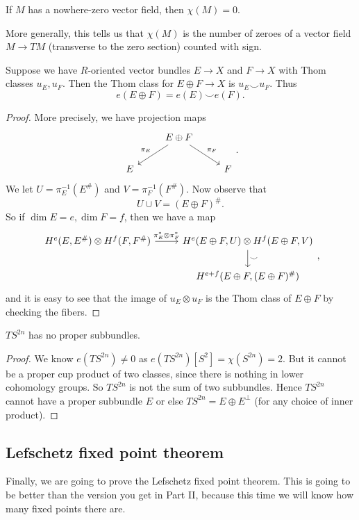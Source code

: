 \documentclass[a4paper]{article}
\theoremstyle{definition}
\begin{document}
\begin{cor}
  If $M$ has a nowhere-zero vector field, then $\chi(M) = 0$.
\end{cor}

More generally, this tells us that $\chi(M)$ is the number of zeroes of a vector field $M \to TM$ (transverse to the zero section) counted with sign.

\begin{lemma}
  Suppose we have $R$-oriented vector bundles $E \to X$ and $F \to X$ with Thom classes $u_E, u_F$. Then the Thom class for $E \oplus F \to X$ is $u_E \smile u_F$. Thus
  \[
    e(E \oplus F) = e(E) \smile e(F).
  \]
\end{lemma}

\begin{proof}
  More precisely, we have projection maps
  \[
    \begin{tikzcd}
      & E \oplus F \ar[dl, "\pi_E"'] \ar[rd, "\pi_F"]\\
      E & & F
    \end{tikzcd}.
  \]
  We let $U = \pi_E^{-1}(E^\#)$ and $V = \pi_F^{-1}(F^\#)$. Now observe that
  \[
    U \cup V = (E \oplus F)^\#.
  \]
  So if $\dim E = e, \dim F = f$, then we have a map
  \[
    \begin{tikzcd}
      H^e(E, E^\#) \otimes H^f(F, F^\#) \ar[r, "\pi_E^* \otimes \pi_F^*"] & H^e(E \oplus F, U) \otimes H^f(E \oplus F, V) \ar[d, "\smile"] \\
      & H^{e + f}(E \oplus F, (E \oplus F)^\#)
    \end{tikzcd},
  \]
  and it is easy to see that the image of $u_E \otimes u_F$ is the Thom class of $E \oplus F$ by checking the fibers.
\end{proof}

\begin{cor}
  $TS^{2n}$ has no proper subbundles.
\end{cor}

\begin{proof}
  We know $e(TS^{2n}) \not= 0$ as $e(TS^{2n})[S^2] = \chi(S^{2n}) = 2$. But it cannot be a proper cup product of two classes, since there is nothing in lower cohomology groups. So $TS^{2n}$ is not the sum of two subbundles. Hence $TS^{2n}$ cannot have a proper subbundle $E$ or else $TS^{2n} = E \oplus E^\perp$ (for any choice of inner product).
\end{proof}

\subsection{Lefschetz fixed point theorem}
Finally, we are going to prove the Lefschetz fixed point theorem. This is going to be better than the version you get in Part II, because this time we will know how many fixed points there are.
\end{document}
